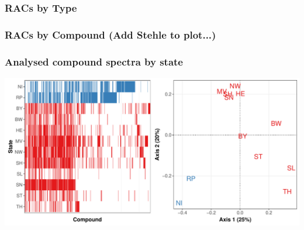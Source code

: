 \documentclass[
	10pt
	]{beamer}
\begin{document}
\begin{frame}
\frametitle{RACs by Type}
	\begin{adjustbox}{max totalsize={\textwidth}{0.95\textheight}}
				
	\end{adjustbox}
\end{frame}

\begin{frame}
\frametitle{RACs by Compound (Add Stehle to plot...)}
	\begin{adjustbox}{max totalsize={\textwidth}{0.95\textheight}}
				
	\end{adjustbox}
\end{frame}


\begin{frame}
\frametitle{Analysed compound spectra by state}
	    	\includegraphics[width=\textwidth]{figs/spectra.pdf}
\end{frame}
\end{document}
